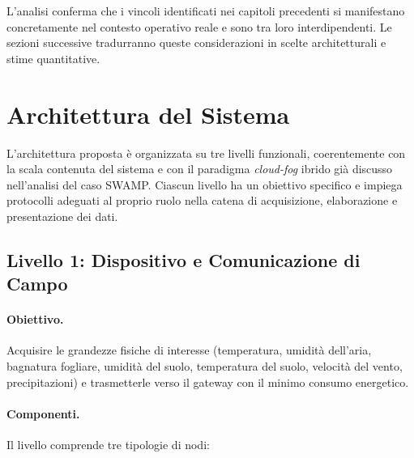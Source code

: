 \noindent L'analisi conferma che i vincoli identificati nei capitoli precedenti si manifestano concretamente nel contesto operativo reale e sono tra loro interdipendenti. Le sezioni successive tradurranno queste considerazioni in scelte architetturali e stime quantitative.


\section{Architettura del Sistema}

L'architettura proposta è organizzata su tre livelli funzionali, coerentemente con la scala contenuta del sistema e con il paradigma \textit{cloud-fog} ibrido già discusso nell'analisi del caso SWAMP. Ciascun livello ha un obiettivo specifico e impiega protocolli adeguati al proprio ruolo nella catena di acquisizione, elaborazione e presentazione dei dati.

\subsection{Livello 1: Dispositivo e Comunicazione di Campo}

\paragraph{Obiettivo.} Acquisire le grandezze fisiche di interesse (temperatura, umidità dell'aria, bagnatura fogliare, umidità del suolo, temperatura del suolo, velocità del vento, precipitazioni) e trasmetterle verso il gateway con il minimo consumo energetico.

\paragraph{Componenti.} Il livello comprende tre tipologie di nodi:

